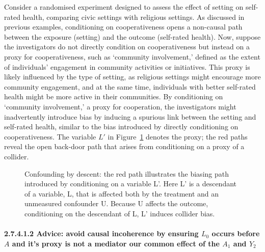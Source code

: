 \documentclass[
  singlecolumn]{article}
\let\oldparagraph\paragraph
\renewcommand{\paragraph}[1]{\oldparagraph{#1}\mbox{}}
\begin{document}
Consider a randomised experiment designed to assess the effect of
setting on self-rated health, comparing civic settings with religious
settings. As discussed in previous examples, conditioning on
cooperativeness opens a non-causal path between the exposure (setting)
and the outcome (self-rated health). Now, suppose the investigators do
not directly condition on cooperativeness but instead on a proxy for
cooperativeness, such as `community involvement,' defined as the extent
of individuals' engagement in community activities or initiatives. This
proxy is likely influenced by the type of setting, as religious settings
might encourage more community engagement, and at the same time,
individuals with better self-rated health might be more active in their
communities. By conditioning on `community involvement,' a proxy for
cooperation, the investigators might inadvertently introduce bias by
inducing a spurious link between the setting and self-rated health,
similar to the bias introduced by directly conditioning on
cooperativeness. The variable \(L'\) in
Figure~\ref{fig-dag-descendant-proxy} denotes the proxy; the red paths
reveal the open back-door path that arises from conditioning on a proxy
of a collider.

\begin{figure}


\caption{\label{fig-dag-descendant-proxy}Confounding by descent: the red
path illustrates the biasing path introduced by conditioning on a
variable L'. Here L' is a descendant of a variable, L, that is affected
both by the treatment and an unmeasured confounder U. Because U affects
the outcome, conditioning on the descendant of L, L' induces collider
bias.}

\end{figure}%

\paragraph{\texorpdfstring{2.7.4.1.2 Advice: avoid causal incoherence by
ensuring \(L_0\) occurs before \(A\) and it's proxy is not a mediator
our common effect of the \(A_1\) and
\(Y_2\)}{2.7.4.1.2 Advice: avoid causal incoherence by ensuring L\_0 occurs before A and it's proxy is not a mediator our common effect of the A\_1 and Y\_2}}\label{advice-avoid-causal-incoherence-by-ensuring-l_0-occurs-before-a-and-its-proxy-is-not-a-mediator-our-common-effect-of-the-a_1-and-y_2}
\end{document}
